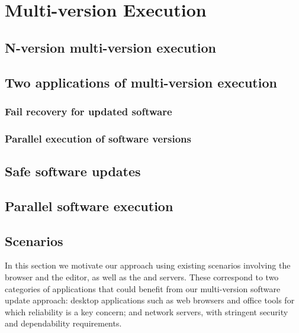 \chapter{Multi-version Execution}
\label{chap:multi-version}

\section{N-version \vs multi-version execution}

\section{Two applications of multi-version execution}
\subsection{Fail recovery for updated software}
\subsection{Parallel execution of software versions}
%

\section{Safe software updates}

\section{Parallel software execution}

\section{Scenarios}
\label{nversion-updates:motivation}

In this section we motivate our approach using existing scenarios
involving the \chrome browser and the \vim editor, as well as the \lighttpd
and \vsftpd servers.  These correspond to two categories of
applications that could benefit from our multi-version software update
approach: desktop applications such as web browsers and office tools
for which reliability is a key concern; and network servers, with
stringent security and dependability requirements.


